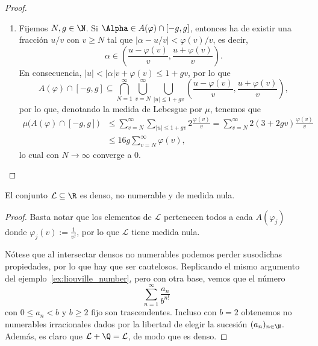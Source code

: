\documentclass[teoria-numeros.tex]{subfiles}
\begin{document}
\begin{proof}
\begin{enumerate}
		\item Fijemos $N, g \in \N$.
			Si $\Alpha \in A( \varphi) \cap [-g, g]$, entonces ha de existir una fracción $u/v$ con $v \ge N$
			tal que $|\alpha - u/v| < \varphi(v)/v$, es decir,
			$$ \alpha \in \left( \frac{u - \varphi(v)}{v}, \frac{u + \varphi(v)}{v} \right). $$
			En consecuencia, $|u| < |\alpha|v + \varphi(v) \le 1 + gv$, por lo que
			$$ A(\varphi) \cap [-g, g] \subseteq \bigcap_{N=1}^\infty \bigcup_{v=N}^{\infty} \bigcup_{|u| \le 1 + gv} \left( \frac{u - \varphi(v)}{v},
			\frac{u + \varphi(v)}{v} \right), $$
			por lo que, denotando la medida de Lebesgue por $\mu$, tenemos que
			\begin{align*}
				\mu\big( A(\varphi) \cap [-g, g] \big) &\le \sum_{v=N}^{\infty} \sum_{|u| \le 1 + gv} 2 \frac{\varphi(v)}{v}
				= \sum_{v=N}^{\infty} 2(3 + 2gv) \frac{\varphi(v)}{v} \\
								       &\le 16g \sum_{v=N}^{\infty} \varphi(v),
			\end{align*}
			lo cual con $N \to \infty$ converge a 0. \qedhere
	\end{enumerate}
\end{proof}

\begin{cor}
	El conjunto $\mathcal{L} \subseteq \R$ es denso, no numerable y de medida nula.
\end{cor}
\begin{proof}
	Basta notar que los elementos de $\mathcal{L}$ pertenecen todos a cada $A(\varphi_j)$ donde $\varphi_j(v) := \frac{1}{v^j}$,
	por lo que $\mathcal{L}$ tiene medida nula.

	Nótese que al intersectar densos no numerables podemos perder susodichas propiedades, por lo que hay que ser cautelosos.
	Replicando el mismo argumento del ejemplo~\ref{ex:liouville_number}, pero con otra base, vemos que el número
	\[
		\sum_{n=1}^{\infty} \frac{a_n}{b^{n!}}
	\]
	con $0 \le a_n < b$ y $b \ge 2$ fijo son trascendentes.
	Incluso con $b = 2$ obtenemos no numerables irracionales dados por la libertad de elegir la sucesión $(a_n)_{n \in \N}$.
	Además, es claro que $\mathcal{L} + \Q = \mathcal{L}$, de modo que es denso.
\end{proof}
\end{document}

